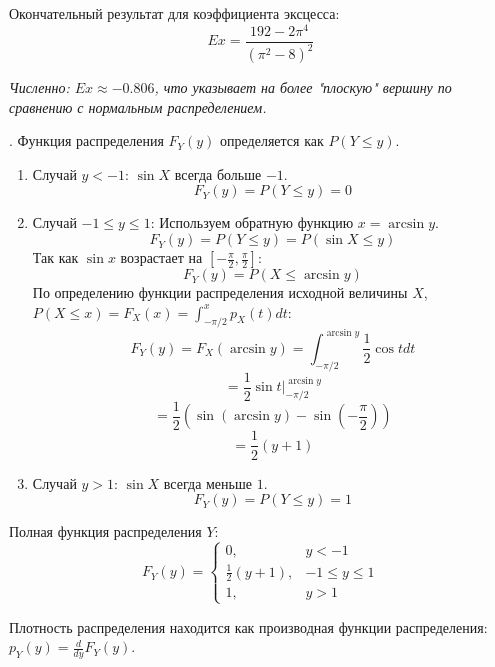 \documentclass[a4paper,14pt]{extarticle}
\begin{document}
            Окончательный результат для коэффициента эксцесса:
            $$
            \boxed{Ex = \frac{192 - 2\pi^4}{(\pi^2 - 8)^2}}
            $$
            
            \textit{Численно: $Ex \approx -0.806$, что указывает на более "плоскую" вершину по сравнению с нормальным распределением.}
            
            . Функция распределения $F_Y(y)$ определяется как $P(Y \le y)$.
            
            \begin{enumerate}
                \item Случай $y < -1$: $\sin X$ всегда больше $-1$.
                $$
                F_Y(y) = P(Y \le y) = 0
                $$
                \item Случай $-1 \le y \le 1$: Используем обратную функцию $x = \arcsin y$.
                $$
                F_Y(y) = P(Y \le y) = P(\sin X \le y)
                $$
                Так как $\sin x$ возрастает на $\left[-\frac{\pi}{2}, \frac{\pi}{2}\right]$:
                $$
                F_Y(y) = P(X \le \arcsin y)
                $$
                По определению функции распределения исходной величины $X$, $P(X \le x) = F_X(x) = \int_{-\pi/2}^{x} p_X(t) dt$:
                $$
                F_Y(y) = F_X(\arcsin y) = \int_{-\pi/2}^{\arcsin y} \frac{1}{2} \cos t dt
                $$
                \[ = \frac{1}{2} \sin t|_{-\pi/2}^{\arcsin y} \]
                \[ = \frac{1}{2} \left( \sin(\arcsin y) - \sin\left(-\frac{\pi}{2}\right) \right) \]
                \[ = \frac{1}{2}(y + 1)\]
                
                \item Случай $y > 1$: $\sin X$ всегда меньше $1$.
                $$
                F_Y(y) = P(Y \le y) = 1
                $$
            \end{enumerate}
            
            Полная функция распределения $Y$:
            $$
            \boxed{F_Y(y) =
                \begin{cases}
                    0, & y < -1 \\
                    \frac{1}{2}(y + 1), & -1 \le y \le 1 \\
                    1, & y > 1
                \end{cases}}
            $$
            
            Плотность распределения находится как производная функции распределения: $p_Y(y) = \frac{d}{dy} F_Y(y)$.
            
\end{document}
